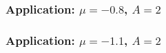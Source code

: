 \documentclass{beamer}
\begin{document}
\begin{frame}
\frametitle{Application: $\mu = -0.8$, $A = 2$}

\begin{figure}
\label{pic:diagram_step_2}
\end{figure}

\end{frame}


\begin{frame}
\frametitle{Application: $\mu = -1.1$, $A = 2$}

\begin{figure}
\label{pic:diagram_step_3}
\end{figure}

\end{frame}
\end{document}
